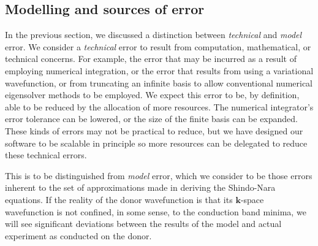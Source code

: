 







\subsection{Modelling and sources of error}

In the previous section, we discussed a distinction between \emph{technical} and
\emph{model} error. We consider a \emph{technical} error to result from
computation, mathematical, or technical concerns. For example, the error that
may be incurred as a result of employing numerical integration, or the error
that results from using a variational wavefunction, or from truncating an
infinite basis to allow conventional numerical eigensolver methods to be
employed. We expect this error to be, by definition, able to be reduced by the
allocation of more resources. The numerical integrator's error tolerance can be
lowered, or the size of the finite basis can be expanded. These kinds of errors
may not be practical to reduce, but we have designed our software to be scalable
in principle so more resources can be delegated to reduce these technical
errors.

This is to be distinguished from \emph{model} error, which we consider to be
those errors inherent to the set of approximations made in deriving the
Shindo-Nara equations. If the reality of the donor wavefunction is that its
$\bm{k}$-space wavefunction is not confined, in some sense, to the conduction
band minima, we will see significant deviations between the results of the
model and actual experiment as conducted on the donor.

